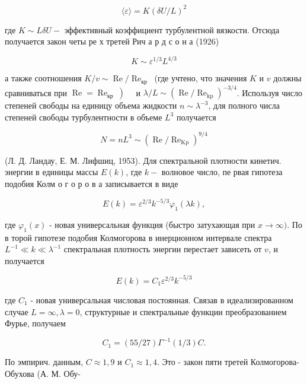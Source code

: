 \documentclass[10pt]{article}
\begin{document}
\[

\langle\varepsilon\rangle=K(\delta U / L)^{2}

\]



где $K \sim L \delta U-$ эффективный коэффициент турбулентной вязкости. Отсюда получается закон четы ре х третей Рич а р д с о н а (1926)



\[

K \sim \varepsilon^{1 / 3} L^{4 / 3}

\]



а также соотношения $K / v \sim \operatorname{Re} / \operatorname{Re}_{\text {кр }}$ (где учтено, что значения $K$ и $v$ должны сравниваться при $\left.\operatorname{Re}=\operatorname{Re}_{\text {кр }}\right) \quad$ и $\lambda / L \sim\left(\operatorname{Re} / \operatorname{Re}_{\mathrm{kp}}\right)^{-3 / 4}$. Используя число степеней свободы на единицу объема жидкости $n \sim \lambda^{-3}$, для полного числа степеней свободы турбулентности в объеме $L^{3}$ получается



\[

N=n L^{3} \sim\left(\operatorname{Re} / \operatorname{Re}_{\mathrm{Kp}}\right)^{9 / 4}

\]



(Л. Д. Ландау, Е. М. Лифшиц, 1953). Для спектральной плотности кинетич. энергии в единицы массы $E(k)$, где $k-$ волновое число, пе рвая гипотеза подобия Колм о г о р о в а записывается в виде



\[

E(k)=\varepsilon^{2 / 3} k^{-5 / 3} \varphi_{1}(\lambda k),

\]



где $\varphi_{1}(x)$ - новая универсальная функция (быстро затухающая при $x \rightarrow \infty)$. По в торой гипотезе подобия Колмогорова в инерционном интервале спектра $L^{-1} \ll k \ll \lambda^{-1}$ спектральная плотность энергии перестает зависеть от $v$, и получается



\[

E(k)=C_{1} \varepsilon^{2 / 3} k^{-5 / 3}

\]



где $C_{1}$ - новая универсальная числовая постоянная. Связав в идеализированном случае $L=\infty, \lambda=0$, структурные и спектральные функции преобразованием Фурье, получаем



\[

C_{1}=(55 / 27) \Gamma^{-1}(1 / 3) C .

\]



По эмпирич. данным, $C \approx 1,9$ и $C_{1} \approx 1,4$. Это - закон пяти третей Колмогорова-Обухова (А. М. Обу-
\end{document}
